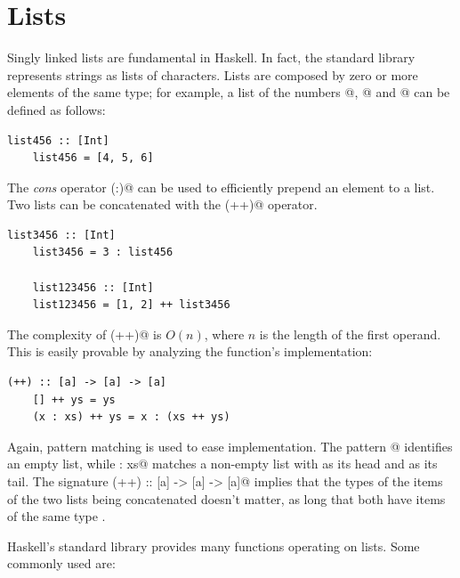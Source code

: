 \documentclass[UdineBachThesis,american,11pt]{PhdThesis}
\begin{document}
  \section{Lists}

  Singly linked lists are fundamental in Haskell. In fact, the standard library
  represents strings as lists of characters. Lists are composed by zero or more
  elements of the same type; for example, a list of the numbers @,
  @ and @ can be defined as follows:

  \begin{lstlisting}[gobble=4,basicstyle=\ttfamily\small]
    list456 :: [Int]
    list456 = [4, 5, 6]
  \end{lstlisting}

  The \emph{cons} operator \lstinline@(:)@ can be used to efficiently prepend an
  element to a list. Two lists can be concatenated with the \lstinline@(++)@
  operator.

  \begin{lstlisting}[gobble=4,basicstyle=\ttfamily\small]
    list3456 :: [Int]
    list3456 = 3 : list456

    list123456 :: [Int]
    list123456 = [1, 2] ++ list3456
  \end{lstlisting}

  The complexity of \lstinline@(++)@ is
  $O\mathopen{}\left(n\right)\mathclose{}$, where $n$ is the length of the first
  operand. This is easily provable by analyzing the function's implementation:

  \begin{lstlisting}[gobble=4,basicstyle=\ttfamily\small]
    (++) :: [a] -> [a] -> [a]
    [] ++ ys = ys
    (x : xs) ++ ys = x : (xs ++ ys)
  \end{lstlisting}

  Again, pattern matching is used to ease implementation. The pattern
  \lstinline@[]@ identifies an empty list, while \lstinline@x : xs@ matches a
  non-empty list with \lstinline@x@ as its head and \lstinline@xs@ as its tail.
  The signature \lstinline@(++) :: [a] -> [a] -> [a]@ implies that the types of
  the items of the two lists being concatenated doesn't matter, as long that
  both have items of the same type \lstinline@a@.

  Haskell's standard library provides many functions operating on lists. Some
  commonly used are:
\end{document}
